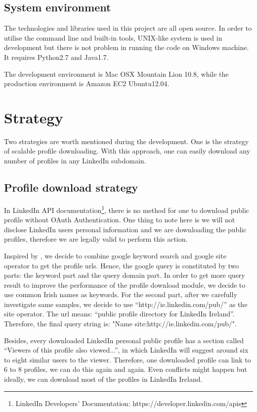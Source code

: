 \subsection{System environment}

The technologies and libraries used in this project are all open source. In order to utilise the command line and built-in tools, UNIX-like system is used in development but there is not problem in running the code on Windows machine. It requires Python2.7 and Java1.7.

The development environment is Mac OSX Mountain Lion 10.8, while the production environment is Amazon EC2 Ubuntu12.04.

\section{Strategy}

Two strategies are worth mentioned during the development. One is the strategy of scalable profile downloading. With this approach, one can easily download any number of profiles in any LinkedIn subdomain.

\subsection{Profile download strategy}
In LinkedIn API documentation\footnote{LinkedIn Developers' Documentation: https://developer.linkedin.com/apis}, there is no method for one to download public profile without OAuth Authentication. One thing to note here is we will not disclose LinkedIn users personal information and we are downloading the public profiles, therefore we are legally valid to perform this action.

Inspired by \cite{li2012}, we decide to combine google keyword search and google site operator to get the profile urls. Hence, the google query is constituted by two parts: the keyword part and the query domain part. In order to get more query result to improve the performance of the profile download module, we decide to use common Irish names as keywords. For the second part, after we carefully investigate same samples, we decide to use ``http://ie.linkedin.com/pub/'' as the site operator. The url means: ``public profile directory for LinkedIn Ireland''. Therefore, the final query string is: "{Name} site:http://ie.linkedin.com/pub/".

Besides, every downloaded LinkedIn personal public profile has a section called ``Viewers of this profile also viewed...'', in which LinkedIn will suggest around six to eight similar users to the viewer. Therefore, one downloaded profile can link to 6 to 8 profiles, we can do this again and again. Even conflicts might happen but ideally, we can download most of the profiles in LinkedIn Ireland.

